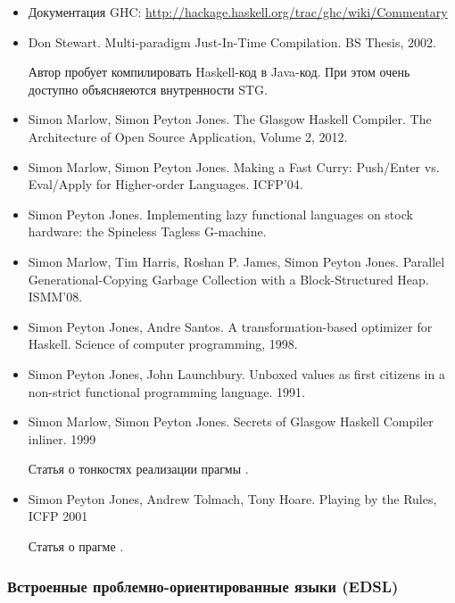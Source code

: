\begin{itemize}
\item Документация GHC:
\url{http://hackage.haskell.org/trac/ghc/wiki/Commentary}

\item Don Stewart. Multi-paradigm Just-In-Time Compilation. BS Thesis, 2002.

    Автор пробует компилировать Haskell-код в Java-код. При этом
    очень доступно объясняеются внутренности STG. 

\item Simon Marlow, Simon Peyton Jones. The Glasgow Haskell Compiler. 
    The Architecture of Open Source Application, Volume 2, 2012.

\item Simon Marlow, Simon Peyton Jones. Making a Fast Curry: Push/Enter vs.
    Eval/Apply for Higher-order Languages. ICFP'04.

\item Simon Peyton Jones. Implementing lazy functional languages
on stock hardware: the Spineless Tagless G-machine.

\item Simon Marlow, Tim Harris, Roshan P. James, Simon Peyton Jones.
    Parallel Generational-Copying Garbage Collection with a 
    Block-Structured Heap. ISMM'08.

\item Simon Peyton Jones, Andre Santos. 
    A transformation-based optimizer for Haskell.
    Science of computer programming, 1998.

\item Simon Peyton Jones, John Launchbury. 
    Unboxed values as first citizens in a non-strict 
    functional programming language. 1991.

\item Simon Marlow, Simon Peyton Jones. 
    Secrets of Glasgow Haskell Compiler inliner. 1999

    Статья о тонкостях реализации прагмы .

\item Simon Peyton Jones, Andrew Tolmach, Tony Hoare.
    Playing by the Rules, ICFP 2001

    Статья о прагме .
\end{itemize}

\subsubsection{Встроенные проблемно-ориентированные языки (EDSL)}


